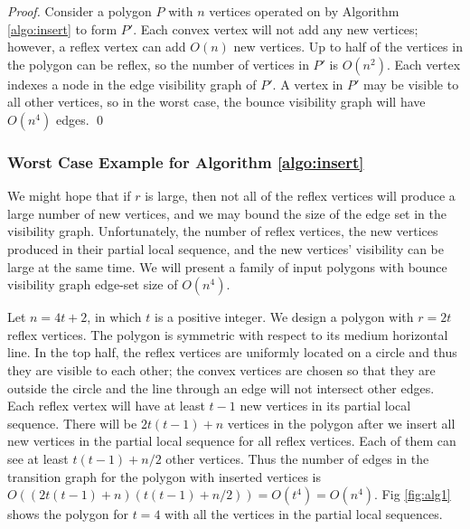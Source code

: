 \documentclass[sageh,times,Review]{sagej}
\begin{document}
\begin{proof}

Consider a polygon $P$ with $n$ vertices operated on by Algorithm
\ref{algo:insert} to form $P'$. Each convex vertex will not add any new vertices; however, 
a reflex vertex can add $O(n)$ new vertices. Up to half of the vertices in the polygon 
can be reflex, so the number of vertices in $P'$ is $O(n^2)$. 
Each vertex indexes a node in the edge visibility graph of $P'$. A vertex 
in $P'$ may be visible to all other vertices, so in the worst
case, the bounce visibility graph will have $O(n^4)$ edges. \qed

\end{proof}

\subsubsection*{Worst Case Example for Algorithm \ref{algo:insert}}

We might hope that if $r$ is large, then not all of the reflex vertices will
produce a large number of new vertices, and we may bound the size of the edge
set in the visibility graph. Unfortunately, the number of reflex
vertices, the new vertices produced in their partial local sequence, and the new
vertices' visibility can be large at the same time. We will present a family of
input polygons with bounce visibility graph edge-set size of $O(n^4)$.

Let $n = 4t+2$, in which $t$ is a positive integer. We design a polygon with
$r = 2t$ reflex vertices. The polygon is symmetric with respect to its medium
horizontal line. In the top half, the reflex vertices are uniformly located on a
circle and thus they are visible to each other; the convex vertices are chosen
so that they are outside the circle and the line through an edge will not
intersect other edges. Each reflex vertex will have at least $t-1$ new
vertices in its partial local sequence. There will be $2t(t-1)+n$
vertices in the polygon after we insert all new vertices in the partial local
sequence for all reflex vertices. Each of them can see at least $t(t-1)+n/2$
other vertices. Thus the number of edges in the transition graph for the
polygon with inserted vertices is
$O ((2t(t-1)+n)(t(t-1)+n/2)) = O(t^4) = O(n^4)$.
Fig \ref{fig:alg1} shows the polygon for $t = 4$ with all the
vertices in the partial local sequences.
\end{document}
